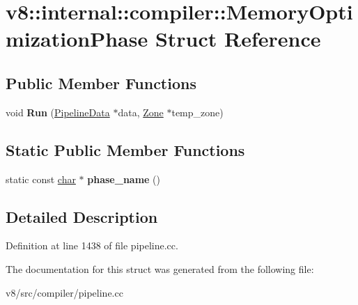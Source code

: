 \hypertarget{structv8_1_1internal_1_1compiler_1_1MemoryOptimizationPhase}{}\section{v8\+:\+:internal\+:\+:compiler\+:\+:Memory\+Optimization\+Phase Struct Reference}
\label{structv8_1_1internal_1_1compiler_1_1MemoryOptimizationPhase}
\subsection*{Public Member Functions}
\begin{DoxyCompactItemize}
\item 
\mbox{\label{structv8_1_1internal_1_1compiler_1_1MemoryOptimizationPhase_aada66907f389a1ab2fa17c679ed61ed4}} 
void {\bfseries Run} (\mbox{\hyperlink{classv8_1_1internal_1_1compiler_1_1PipelineData}{Pipeline\+Data}} $\ast$data, \mbox{\hyperlink{classv8_1_1internal_1_1Zone}{Zone}} $\ast$temp\+\_\+zone)
\end{DoxyCompactItemize}
\subsection*{Static Public Member Functions}
\begin{DoxyCompactItemize}
\item 
\mbox{\label{structv8_1_1internal_1_1compiler_1_1MemoryOptimizationPhase_a37c9a962f245a6ec281469b5381bd0df}} 
static const \mbox{\hyperlink{classchar}{char}} $\ast$ {\bfseries phase\+\_\+name} ()
\end{DoxyCompactItemize}


\subsection{Detailed Description}


Definition at line 1438 of file pipeline.\+cc.



The documentation for this struct was generated from the following file\+:\begin{DoxyCompactItemize}
\item 
v8/src/compiler/pipeline.\+cc\end{DoxyCompactItemize}
